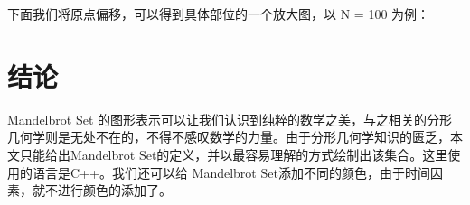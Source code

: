 \documentclass{ctexart}
\begin{document}
下面我们将原点偏移，可以得到具体部位的一个放大图，以 N = 100 为例：
\begin{figure}[H]
\centering
{}
\end{figure}

\section{结论}

Mandelbrot Set 的图形表示可以让我们认识到纯粹的数学之美，与之相关的分形几何学则是无处不在的，不得不感叹数学的力量。由于分形几何学知识的匮乏，本文只能给出Mandelbrot Set的定义，并以最容易理解的方式绘制出该集合。这里使用的语言是C++。我们还可以给 Mandelbrot Set添加不同的颜色，由于时间因素，就不进行颜色的添加了。 \cite{王伊蕾2015LaTeX}



\end{document}
